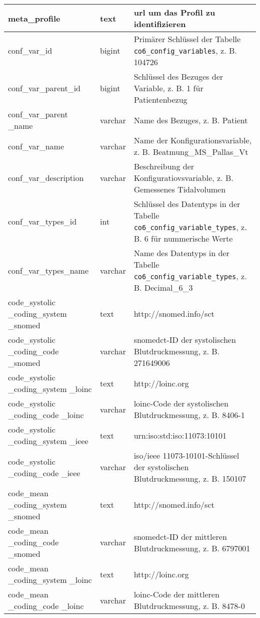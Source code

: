 \begin{longtable}{|p{3.5cm}|l|p{6.5cm}|}
		meta\_profile & text &  \ac{url} um das Profil zu identifizieren \\ \hline
		conf\_var\_id & bigint & Primärer Schlüssel der Tabelle \texttt{co6\_config\_variables}, z. B. 104726 \\ \hline
		conf\_var\_parent\_id & bigint & Schlüssel des Bezuges der Variable, z. B. 1 für Patientenbezug \\ \hline
		conf\_var\_parent \_name & varchar & Name des Bezuges, z. B. Patient \\ \hline
		conf\_var\_name & varchar & Name der Konfigurationsvariable, z. B. Beatmung\_MS\_Pallas\_Vt \\ \hline
		conf\_var\_description & varchar & Beschreibung der Konfiguratiovsvariable, z. B. Gemessenes Tidalvolumen \\ \hline
		conf\_var\_types\_id & int & Schlüssel des Datentyps in der Tabelle \texttt{co6\_config\_variable\_types}, z. B. 6 für nummerische Werte \\ \hline
		conf\_var\_types\_name & varchar & Name des Datentyps in der Tabelle \texttt{co6\_config\_variable\_types}, z. B. Decimal\_6\_3 \\ \hline
		code\_systolic \_coding\_system \_snomed & text & http://snomed.info/sct \\ \hline
		code\_systolic \_coding\_code \_snomed & varchar & \ac{snomedct}-ID der systolischen Blutdruckmessung, z. B. 271649006 \\ \hline
		code\_systolic \_coding\_system \_loinc & text & http://loinc.org \\ \hline
		code\_systolic \_coding\_code \_loinc & varchar & \ac{loinc}-Code der systolischen Blutdruckmessung, z. B. 8406-1 \\ \hline
		code\_systolic \_coding\_system \_ieee & text & urn:iso:std:iso:11073:10101 \\ \hline
		code\_systolic \_coding\_code \_ieee & varchar & \ac{iso}/\ac{ieee} 11073-10101\texttrademark{}-Schlüssel der systolischen Blutdruckmessung, z. B. 150107 \\ \hline
		code\_mean \_coding\_system \_snomed & text & http://snomed.info/sct \\ \hline
		code\_mean \_coding\_code \_snomed & varchar & \ac{snomedct}-ID der mittleren Blutdruckmessung, z. B. 6797001 \\ \hline
		code\_mean \_coding\_system \_loinc & text & http://loinc.org \\ \hline
		code\_mean \_coding\_code \_loinc & varchar & \ac{loinc}-Code der mittleren Blutdruckmessung, z. B. 8478-0 \\ \hline

\end{longtable}
